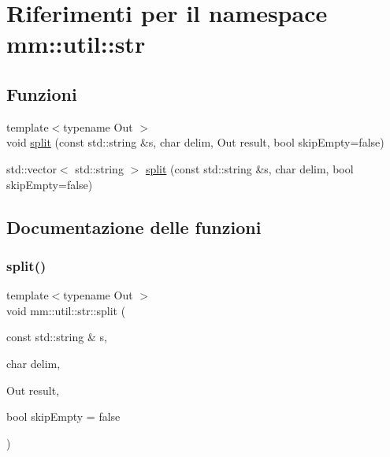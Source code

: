 \hypertarget{namespacemm_1_1util_1_1str}{}\section{Riferimenti per il namespace mm\+:\+:util\+:\+:str}
\label{namespacemm_1_1util_1_1str}
\subsection*{Funzioni}
\begin{DoxyCompactItemize}
\item 
{\footnotesize template$<$typename Out $>$ }\\void \mbox{\hyperlink{namespacemm_1_1util_1_1str_a0d736c6931c50f009683998b5b4cdcaa}{split}} (const std\+::string \&s, char delim, Out result, bool skip\+Empty=false)
\item 
std\+::vector$<$ std\+::string $>$ \mbox{\hyperlink{namespacemm_1_1util_1_1str_a8e83f696879551bdc931a85f037a4671}{split}} (const std\+::string \&s, char delim, bool skip\+Empty=false)
\end{DoxyCompactItemize}


\subsection{Documentazione delle funzioni}
\mbox{\label{namespacemm_1_1util_1_1str_a0d736c6931c50f009683998b5b4cdcaa}} 
\subsubsection{\texorpdfstring{split()}{split()}\hspace{0.1cm}{\footnotesize\ttfamily [1/2]}}
{\footnotesize\ttfamily template$<$typename Out $>$ \\
void mm\+::util\+::str\+::split (\begin{DoxyParamCaption}\item[{const std\+::string \&}]{s,  }\item[{char}]{delim,  }\item[{Out}]{result,  }\item[{bool}]{skip\+Empty = {\ttfamily false} }\end{DoxyParamCaption})}

\mbox{\label{namespacemm_1_1util_1_1str_a8e83f696879551bdc931a85f037a4671}} 
